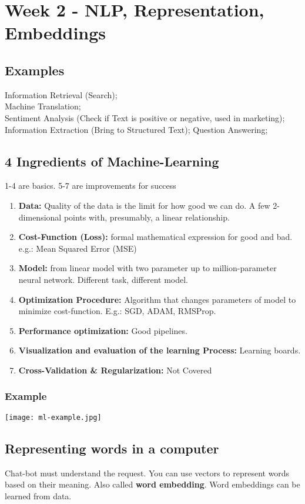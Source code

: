 \section{Week 2 - NLP, Representation, Embeddings}
\subsection{Examples}
Information Retrieval (Search);\\
Machine Translation;\\
Sentiment Analysis (Check if Text is positive or negative, used in marketing);\\
Information Extraction (Bring to Structured Text);
Question Answering;

\subsection{4 Ingredients of Machine-Learning}
1-4 are basics. 5-7 are improvements for success
\begin{enumerate}
    \item \textbf{Data:} Quality of the data is the limit for how good we can do. A few 2-dimensional points with, presumably, a linear relationship.
    \item \textbf{Cost-Function (Loss):} formal mathematical expression for good and bad. e.g.: Mean Squared Error (MSE)
    \item \textbf{Model:} from linear model with two parameter up to million-parameter neural network. Different task, different model.
    \item \textbf{Optimization Procedure:} Algorithm that changes parameters of model to minimize cost-function. E.g.: SGD, ADAM, RMSProp.
    \item \textbf{Performance optimization:} Good pipelines.
    \item \textbf{Visualization and evaluation of the learning Process:} Learning boards.
    \item \textbf{Cross-Validation \& Regularization: } Not Covered
\end{enumerate}

\subsubsection{Example}
\texttt{[image: ml-example.jpg]}

\subsection{Representing words in a computer}
Chat-bot must understand the request.
You can use vectors to represent words based on their meaning.
Also called \textbf{word embedding}. Word embeddings can be learned from data.

